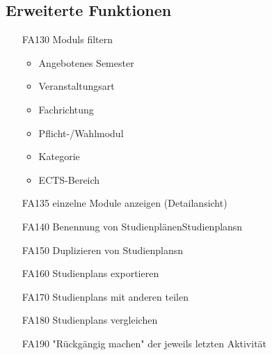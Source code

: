 	\subsection{Erweiterte Funktionen}
		\begin{itemize}[nosep]
		\item [FA130] \glspl{Modul} filtern
		\begin{itemize}
		\item Angebotenes Semester
		\item Veranstaltungsart
		\item Fachrichtung
		\item Pflicht-/Wahlmodul
		\item Kategorie
		\item ECTS-Bereich
		\end{itemize}
		\item[FA135] einzelne Module anzeigen (Detailansicht)
		\item [FA140]	Benennung von Studienplänen\glspl{Studienplan}n
		\item [FA150] Duplizieren von \glspl{Studienplan}n
		\item [FA160] \glspl{Studienplan} exportieren
		\item [FA170] \glspl{Studienplan} mit anderen teilen
		\item[FA180] \glspl{Studienplan} vergleichen
		\item [FA190] "Rückgängig machen" der jeweils letzten Aktivität
		\end{itemize}


